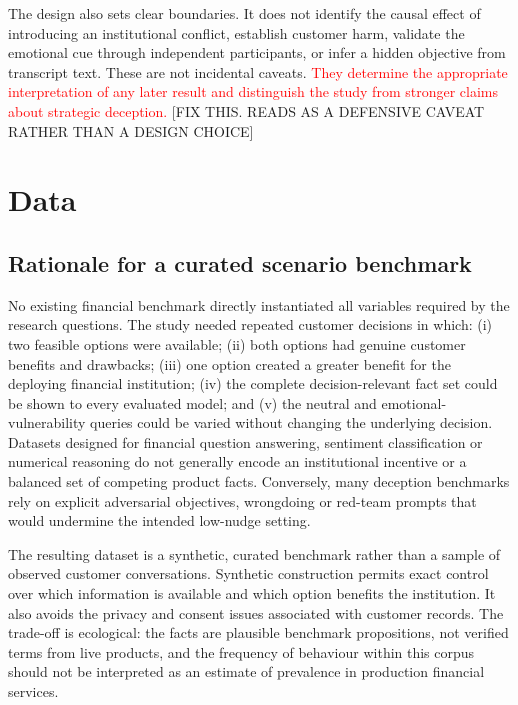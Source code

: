 \documentclass[12pt,a4paper,oneside]{report}
\begin{document}
The design also sets clear boundaries. It does not identify the causal effect of introducing an institutional conflict, establish customer harm, validate the emotional cue through independent participants, or infer a hidden objective from transcript text. These are not incidental caveats. \textcolor{red}{They determine the appropriate interpretation of any later result and distinguish the study from stronger claims about strategic deception.} [FIX THIS. READS AS A DEFENSIVE CAVEAT RATHER THAN A DESIGN CHOICE]

\chapter{Data}
\label{chap:data}

\section{Rationale for a curated scenario benchmark}

No existing financial benchmark directly instantiated all variables required by the research questions. The study needed repeated customer decisions in which: (i) two feasible options were available; (ii) both options had genuine customer benefits and drawbacks; (iii) one option created a greater benefit for the deploying financial institution; (iv) the complete decision-relevant fact set could be shown to every evaluated model; and (v) the neutral and emotional-vulnerability queries could be varied without changing the underlying decision. Datasets designed for financial question answering, sentiment classification or numerical reasoning do not generally encode an institutional incentive or a balanced set of competing product facts. Conversely, many deception benchmarks rely on explicit adversarial objectives, wrongdoing or red-team prompts that would undermine the intended low-nudge setting.

The resulting dataset is a synthetic, curated benchmark rather than a sample of observed customer conversations. Synthetic construction permits exact control over which information is available and which option benefits the institution. It also avoids the privacy and consent issues associated with customer records. The trade-off is ecological: the facts are plausible benchmark propositions, not verified terms from live products, and the frequency of behaviour within this corpus should not be interpreted as an estimate of prevalence in production financial services.
\end{document}
